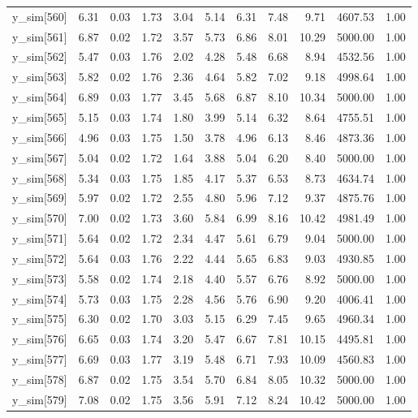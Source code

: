 \begin{table}[ht]
\begin{tabular}{rrrrrrrrrrr}
  y\_sim[560] & 6.31 & 0.03 & 1.73 & 3.04 & 5.14 & 6.31 & 7.48 & 9.71 & 4607.53 & 1.00 \\ 
  y\_sim[561] & 6.87 & 0.02 & 1.72 & 3.57 & 5.73 & 6.86 & 8.01 & 10.29 & 5000.00 & 1.00 \\ 
  y\_sim[562] & 5.47 & 0.03 & 1.76 & 2.02 & 4.28 & 5.48 & 6.68 & 8.94 & 4532.56 & 1.00 \\ 
  y\_sim[563] & 5.82 & 0.02 & 1.76 & 2.36 & 4.64 & 5.82 & 7.02 & 9.18 & 4998.64 & 1.00 \\ 
  y\_sim[564] & 6.89 & 0.03 & 1.77 & 3.45 & 5.68 & 6.87 & 8.10 & 10.34 & 5000.00 & 1.00 \\ 
  y\_sim[565] & 5.15 & 0.03 & 1.74 & 1.80 & 3.99 & 5.14 & 6.32 & 8.64 & 4755.51 & 1.00 \\ 
  y\_sim[566] & 4.96 & 0.03 & 1.75 & 1.50 & 3.78 & 4.96 & 6.13 & 8.46 & 4873.36 & 1.00 \\ 
  y\_sim[567] & 5.04 & 0.02 & 1.72 & 1.64 & 3.88 & 5.04 & 6.20 & 8.40 & 5000.00 & 1.00 \\ 
  y\_sim[568] & 5.34 & 0.03 & 1.75 & 1.85 & 4.17 & 5.37 & 6.53 & 8.73 & 4634.74 & 1.00 \\ 
  y\_sim[569] & 5.97 & 0.02 & 1.72 & 2.55 & 4.80 & 5.96 & 7.12 & 9.37 & 4875.76 & 1.00 \\ 
  y\_sim[570] & 7.00 & 0.02 & 1.73 & 3.60 & 5.84 & 6.99 & 8.16 & 10.42 & 4981.49 & 1.00 \\ 
  y\_sim[571] & 5.64 & 0.02 & 1.72 & 2.34 & 4.47 & 5.61 & 6.79 & 9.04 & 5000.00 & 1.00 \\ 
  y\_sim[572] & 5.64 & 0.03 & 1.76 & 2.22 & 4.44 & 5.65 & 6.83 & 9.03 & 4930.85 & 1.00 \\ 
  y\_sim[573] & 5.58 & 0.02 & 1.74 & 2.18 & 4.40 & 5.57 & 6.76 & 8.92 & 5000.00 & 1.00 \\ 
  y\_sim[574] & 5.73 & 0.03 & 1.75 & 2.28 & 4.56 & 5.76 & 6.90 & 9.20 & 4006.41 & 1.00 \\ 
  y\_sim[575] & 6.30 & 0.02 & 1.70 & 3.03 & 5.15 & 6.29 & 7.45 & 9.65 & 4960.34 & 1.00 \\ 
  y\_sim[576] & 6.65 & 0.03 & 1.74 & 3.20 & 5.47 & 6.67 & 7.81 & 10.15 & 4495.81 & 1.00 \\ 
  y\_sim[577] & 6.69 & 0.03 & 1.77 & 3.19 & 5.48 & 6.71 & 7.93 & 10.09 & 4560.83 & 1.00 \\ 
  y\_sim[578] & 6.87 & 0.02 & 1.75 & 3.54 & 5.70 & 6.84 & 8.05 & 10.32 & 5000.00 & 1.00 \\ 
  y\_sim[579] & 7.08 & 0.02 & 1.75 & 3.56 & 5.91 & 7.12 & 8.24 & 10.42 & 5000.00 & 1.00 \\ 

\end{tabular}
\end{table}
